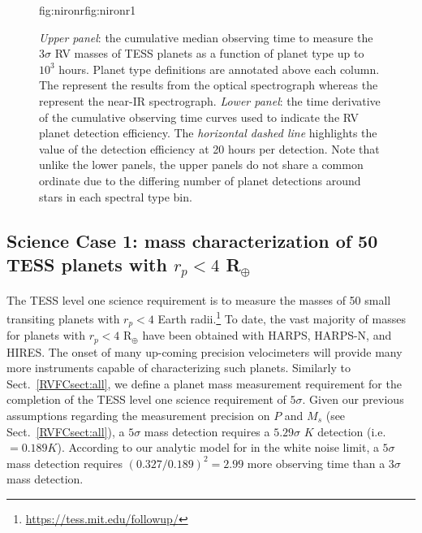 \begin{figure}
\begin{ocg}{fig:nironr}{fig:nironr}{1}
  \end{ocg}
  \hspace{-\hsize}%
  \caption[Cumulative mean observing times to measure RV masses of TOI planets versus planet type.]
          {\small \emph{Upper panel}: the cumulative median observing time to measure the $3\sigma$ RV masses of
    TESS planets as a function of planet type up to $10^3$ hours. Planet type definitions are annotated above
    each column. The  
     represent the results from
    the optical spectrograph whereas the
     represent the near-IR
    spectrograph. \emph{Lower panel}: the time derivative of the cumulative observing time curves used to indicate
    the RV planet detection efficiency. The \emph{horizontal dashed line} highlights the value of the detection
    efficiency at 20 hours per detection.
    Note that unlike the lower panels, the upper panels do not share a common ordinate due to the differing
    number of planet detections around stars in each spectral type bin.}
  \label{RVFCfig:cumulativerp}
\end{figure}


\subsection{Science Case 1: mass characterization of 50 TESS planets with $r_p < 4$ R$_{\oplus}$} \label{RVFCsect:lvl1}
The TESS level one science requirement is to measure the masses of 50 small transiting
planets with $r_p < 4$ Earth
radii.\footnote{\href{https://tess.mit.edu/followup/}{https://tess.mit.edu/followup/}}
To date, the vast majority of masses for planets with $r_p <4$ R$_{\oplus}$ have been obtained
with HARPS, HARPS-N, and HIRES. The onset of many up-coming precision velocimeters
will provide many more instruments capable of characterizing
such planets. Similarly to Sect.~\ref{RVFCsect:all}, we define a planet mass measurement
requirement for the completion of the TESS level one science requirement of $5\sigma$. 
Given our previous assumptions regarding the measurement precision on $P$ and
$M_s$ (see Sect.~\ref{RVFCsect:all}),
a $5\sigma$ mass detection requires a $5.29\sigma$ $K$ detection (i.e. \sigK{} $=0.189 K$).
According to our analytic model for \nrv{} in the white noise limit, a $5\sigma$ mass detection requires
$(0.327/0.189)^2 = 2.99$ more observing time than a $3\sigma$ mass detection.

